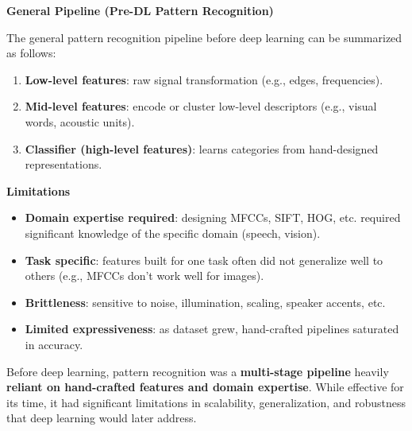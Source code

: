 \highspace
\begin{flushleft}
    \textcolor{Green3}{ \textbf{General Pipeline (Pre-DL Pattern Recognition)}}
\end{flushleft}
The general pattern recognition pipeline before deep learning can be summarized as follows:
\begin{enumerate}
    \item \textbf{Low-level features}: raw signal transformation (e.g., edges, frequencies).
    \item \textbf{Mid-level features}: encode or cluster low-level descriptors (e.g., visual words, acoustic units).
    \item \textbf{Classifier (high-level features)}: learns categories from hand-designed representations.
\end{enumerate}

\begin{flushleft}
    \textcolor{Red2}{ \textbf{Limitations}}
\end{flushleft}
\begin{itemize}
    \item \textbf{Domain expertise required}: designing MFCCs, SIFT, HOG, etc. required significant knowledge of the specific domain (speech, vision).
    \item \textbf{Task specific}: features built for one task often did not generalize well to others (e.g., MFCCs don't work well for images).
    \item \textbf{Brittleness}: sensitive to noise, illumination, scaling, speaker accents, etc. 
    \item \textbf{Limited expressiveness}: as dataset grew, hand-crafted pipelines saturated in accuracy.
\end{itemize}
Before deep learning, pattern recognition was a \textbf{multi-stage pipeline} heavily \textbf{reliant on hand-crafted features and domain expertise}. While effective for its time, it had significant limitations in scalability, generalization, and robustness that deep learning would later address.